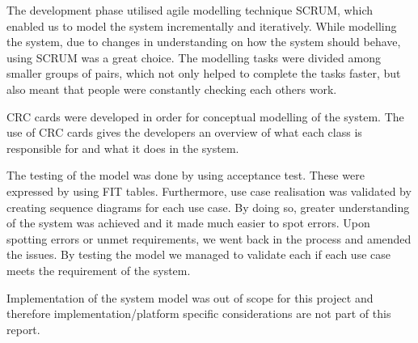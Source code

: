 The development phase utilised agile modelling technique SCRUM, which enabled us to model the system incrementally and iteratively. While modelling the system, due to changes in understanding on how the system should behave, using SCRUM was a great choice.  The modelling tasks were divided among smaller groups of pairs, which not only helped to complete the tasks faster, but also meant that people were constantly checking each others work. 

CRC cards were developed in order for conceptual modelling of the system. The use of CRC cards gives the developers an overview of what each class is responsible for and what it does in the system. 

The testing of the model was done by using acceptance test. These were expressed by using FIT tables. Furthermore, use case realisation was validated by creating sequence diagrams for each use case. By doing so, greater understanding of the system was achieved and it made much easier to spot errors. Upon spotting errors or unmet requirements, we went back in the process and amended the issues. By testing the model we managed to validate each if each use case meets the requirement of the system.

Implementation of the system model was out of scope for this project and therefore implementation/platform specific considerations are not part of this report.